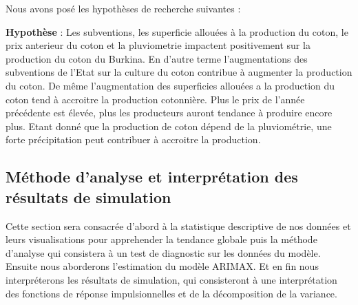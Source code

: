 \documentclass[
  letterpaper,
  DIV=11,
  numbers=noendperiod]{scrartcl}
\begin{document}
\begin{enumerate}
  Nous avons posé les hypothèses de recherche suivantes :

  \textbf{Hypothèse} : Les subventions, les superficie allouées à la
  production du coton, le prix anterieur du coton et la pluviometrie
  impactent positivement sur la production du coton du Burkina. En
  d'autre terme l'augmentations des subventions de l'Etat sur la culture
  du coton contribue à augmenter la production du coton. De même
  l'augmentation des superficies allouées a la production du coton tend
  à accroitre la production cotonnière. Plus le prix de l'année
  précédente est élevée, plus les producteurs auront tendance à produire
  encore plus. Etant donné que la production de coton dépend de la
  pluviométrie, une forte précipitation peut contribuer à accroitre la
  production.
\end{enumerate}

\subsection{Méthode d'analyse et interprétation des résultats de
simulation}\label{muxe9thode-danalyse-et-interpruxe9tation-des-ruxe9sultats-de-simulation}

Cette section sera consacrée d'abord à la statistique descriptive de nos
données et leurs visualisations pour apprehender la tendance globale
puis la méthode d'analyse qui consistera à un test de diagnostic sur les
données du modèle. Ensuite nous aborderons l'estimation du modèle
ARIMAX. Et en fin nous interpréterons les résultats de simulation, qui
consisteront à une interprétation des fonctions de réponse
impulsionnelles et de la décomposition de la variance.
\end{document}
